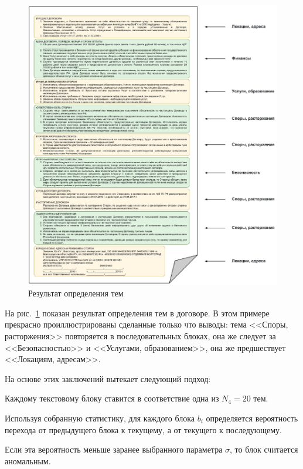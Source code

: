 \documentclass[12pt]{article}
\begin{document}
\begin{center}
	\begin{figure}[h!]
		\centering
		\includegraphics[scale=0.82]{images/im6.eps}
		\caption{Результат определения тем}
		\label{im6}
	\end{figure}
\end{center}

На рис.~\ref{im6} показан результат определения тем в договоре. В этом примере прекрасно проиллюстрированы сделанные только что выводы: тема <<Споры, расторжения>> повторяется в последовательных блоках, она же следует за <<Безопасностью>> и <<Услугами, образованием>>, она же предшествует <<Локациям, адресам>>. 

На основе этих заключений вытекает следующий подход:

\par\begin{enumerate}{
		\vspace{-0.2cm}\item Каждому текстовому блоку ставится в соответствие одна из $N_4 = 20$ тем.
		\vspace{-0.2cm}\item Используя собранную статистику, для каждого блока $b_i$ определяется вероятность перехода от предыдущего блока к текущему, а от текущего к последующему.  
		\vspace{-0.2cm}\item Если эта вероятность меньше заранее выбранного параметра $\sigma$, то блок считается аномальным.
}\end{enumerate}
\end{document}
